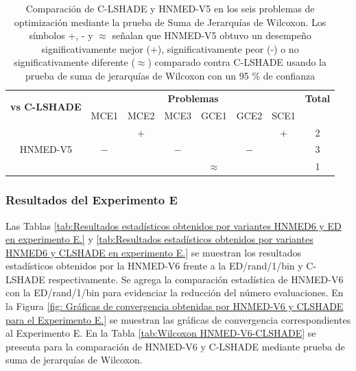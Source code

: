 \begin{table}
	\centering
	\caption[Comparación de C-LSHADE y HNMED-V5 en los seis problemas de optimización mediante la prueba de Suma de Jerarquías de Wilcoxon.]{Comparación de C-LSHADE y HNMED-V5 en los seis problemas de optimización mediante la prueba de Suma de Jerarquías de Wilcoxon. Los símbolos +, - y $\approx$ señalan que HNMED-V5 obtuvo un desempeño significativamente mejor (+), significativamente peor (-) o no significativamente diferente ($\approx$) comparado contra C-LSHADE usando la prueba de suma de jerarquías de Wilcoxon con un 95 \% de confianza} \label{tab:Wilcoxon HNMED-V5-CLSHADE}
	\begin{tabular}{cccccccc}
		\multirow{2}{*}{\textbf{vs C-LSHADE}} & \multicolumn{6}{c}{\textbf{Problemas}}           & \textbf{Total}  \\
		& MCE1 & MCE2 & MCE3 & GCE1 & GCE2 & SCE1 &        \\
		\hline
		\multirow{3}{*}{HNMED-V5}    &      &  $+$    &      &      &       & $ +$    &  2      \\
		&   $-$  &      &  $ -$   &      &  $ - $  &       & 3       \\
		&      &      &       &$\approx$ &  &        &    1
	\end{tabular}
\end{table}


\subsubsection{Resultados del Experimento E}
Las Tablas \ref{tab:Resultados estadísticos obtenidos por variantes HNMED6 y ED  en experimento E.} y \ref{tab:Resultados estadísticos obtenidos por variantes HNMED6 y CLSHADE  en experimento E.} se muestran los resultados estadísticos obtenidos por la HNMED-V6 frente a la ED/rand/1/bin y C-LSHADE respectivamente. Se agrega la comparación estadística de HNMED-V6 con la ED/rand/1/bin para evidenciar la reducción del número evaluaciones. En la Figura \ref{fig: Gráficas de convergencia obtenidas por HNMED-V6 y CLSHADE para el Experimento E.} se muestran las gráficas de convergencia correspondientes al Experimento E. En la Tabla \ref{tab:Wilcoxon HNMED-V6-CLSHADE} se presenta para la comparación de HNMED-V6 y C-LSHADE mediante prueba de suma de jerarquías de Wilcoxon.  

